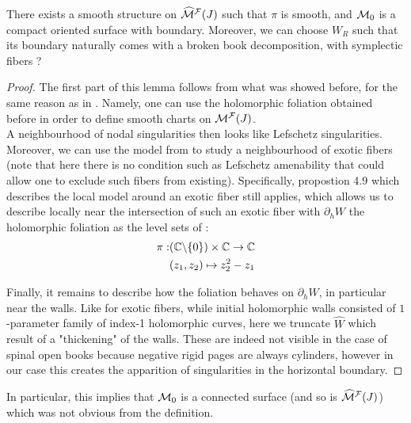 \documentclass[../main.tex]{subfiles}
\begin{document}
\begin{lemma}
There exists a smooth structure on $\widehat{\mathcal{M}}^{\mathcal{F}}(J)$ such that $\pi$ is smooth, and $\mathcal{M}_0$ is a compact oriented surface with boundary. Moreover, we can choose $W_R$ such that its boundary naturally comes with a broken book decomposition, with symplectic fibers ?
\end{lemma}



\begin{proof}
The first part of this lemma follows from what was showed before, for the same reason as in \cite{SOBD2}. Namely, one can use the holomorphic foliation obtained before in order to define smooth charts on $\mathcal{M}^{\mathcal{F}}(J)$. \\

A neighbourhood of nodal singularities then looks like Lefschetz singularities.\\ 

Moreover, we can use the model from \cite{min_spinal_2024} to study a neighbourhood of exotic fibers (note that here there is no condition such as Lefschetz amenability that could allow one to exclude such fibers from existing). Specifically, propostion 4.9 which describes the local model around an exotic fiber still applies, which allows us to describe locally near the intersection of such an exotic fiber with $\partial_hW$ the holomorphic foliation as the level sets of : 
\begin{align*}
\pi : &(\mathbb{C}\backslash\{0\})\times \mathbb{C}\rightarrow \mathbb{C}\\
     &(z_1,z_2)\mapsto z_2^2 - z_1
\end{align*}


Finally, it remains to describe how the foliation behaves on $\partial_hW$, in particular near the walls. Like for exotic fibers, while initial holomorphic walls consisted of $1$-parameter family of index-1 holomorphic curves, here we truncate $\widehat{W}$ which result of a "thickening" of the walls. These are indeed not visible in the case of spinal open books because negative rigid pages are always cylinders, however in our case this creates the apparition of singularities in the horizontal boundary.

    
\end{proof}


\begin{remark}
In particular, this implies that $\mathcal{M}_0$ is a connected surface (and so is $\widehat{\mathcal{M}}^{\mathcal{F}}(J)$) which was not obvious from the definition.
\end{remark}
\end{document}
